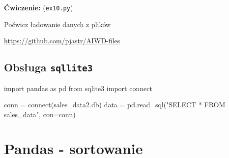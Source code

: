\documentclass[
  polish,
  letterpaper,
  DIV=11,
  numbers=noendperiod]{scrreprt}
\newenvironment{Shaded}{\begin{snugshade}}{\end{snugshade}}
\newcommand{\ExtensionTok}[1]{\textcolor[rgb]{0.00,0.23,0.31}{#1}}
\newcommand{\ImportTok}[1]{\textcolor[rgb]{0.00,0.46,0.62}{#1}}
\newcommand{\NormalTok}[1]{\textcolor[rgb]{0.00,0.23,0.31}{#1}}
\newcommand{\OperatorTok}[1]{\textcolor[rgb]{0.37,0.37,0.37}{#1}}
\newcommand{\StringTok}[1]{\textcolor[rgb]{0.13,0.47,0.30}{#1}}
\begin{document}
\textbf{Ćwiczenie:} (\texttt{ex10.py})

Poćwicz ładowanie danych z plików

\url{https://github.com/pjastr/AIWD-files}

\section{\texorpdfstring{Obsługa
\texttt{sqllite3}}{Obsługa sqllite3}}\label{obsux142uga-sqllite3}

\begin{Shaded}
\begin{Highlighting}[]
\ImportTok{import}\NormalTok{ pandas }\ImportTok{as}\NormalTok{ pd}
\ImportTok{from}\NormalTok{ sqlite3 }\ImportTok{import} \ExtensionTok{connect}

\NormalTok{conn }\OperatorTok{=} \ExtensionTok{connect}\NormalTok{(}\StringTok{\textquotesingle{}sales\_data2.db\textquotesingle{}}\NormalTok{)}
\NormalTok{data }\OperatorTok{=}\NormalTok{ pd.read\_sql(}\StringTok{"SELECT * FROM sales\_data"}\NormalTok{, con}\OperatorTok{=}\NormalTok{conn)}
\end{Highlighting}
\end{Shaded}

\chapter{Pandas - sortowanie}\label{pandas---sortowanie}
\end{document}
